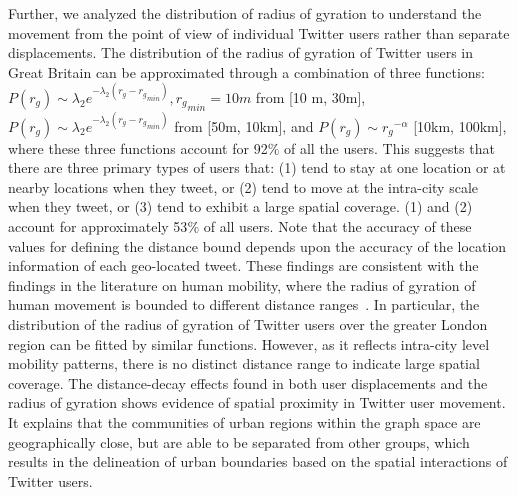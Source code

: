 \documentclass[]{tGIS2e}
\begin{document}
Further, we analyzed the distribution of radius of gyration to understand the movement from the point of view of individual Twitter users rather than separate displacements.
The distribution of the radius of gyration of Twitter users in Great Britain can be approximated through a combination of three functions: $P(r_{g}) \sim \lambda_{2} e^{-\lambda_{2}(r_{g} - {r_{g}}_{min})}, {r_{g}}_{min}=10m$ from [10 m, 30m], $P(r_{g}) \sim \lambda_{2} e^{-\lambda_{2}(r_{g} - {r_{g}}_{min})}$ from [50m, 10km], and $P(r_{g}) \sim {r_{g}}^{-\alpha}$ [10km, 100km], where these three functions account for 92$\%$ of all the users.
This suggests that there are three primary types of users that: (1) tend to stay at one location or at nearby locations when they tweet, or (2) tend to move at the intra-city scale when they tweet, or (3)  tend to exhibit a large spatial coverage. 
(1) and (2) account for approximately 53$\%$ of all users.
Note that the accuracy of these values for defining the distance bound depends upon the accuracy of the location information of each geo-located tweet. 
These findings are consistent with the findings in the literature on human mobility, where the radius of gyration of human movement is bounded to different distance ranges~\citep{brockmann2006,gonzalez2008}.
In particular, the distribution of the radius of gyration of Twitter users over the greater London region can be fitted by similar functions.
However, as it reflects intra-city level mobility patterns, there is no distinct distance range to indicate large spatial coverage.
The distance-decay effects found in both user displacements and the radius of gyration shows evidence of spatial proximity in Twitter user movement. 
It explains that the communities of urban regions within the graph space are geographically close, but are able to be separated from other groups, which results in the delineation of urban boundaries based on the spatial interactions of Twitter users.
\end{document}
